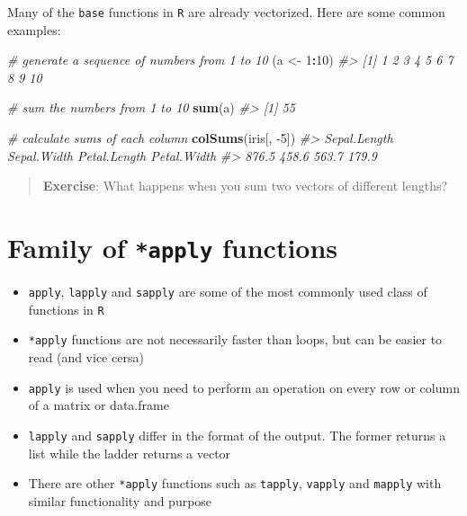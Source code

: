 \documentclass[]{book}
\makeatletter
\newenvironment{Shaded}{\begin{snugshade}}{\end{snugshade}}
\newcommand{\KeywordTok}[1]{\textcolor[rgb]{0.13,0.29,0.53}{\textbf{#1}}}
\newcommand{\DecValTok}[1]{\textcolor[rgb]{0.00,0.00,0.81}{#1}}
\newcommand{\StringTok}[1]{\textcolor[rgb]{0.31,0.60,0.02}{#1}}
\newcommand{\CommentTok}[1]{\textcolor[rgb]{0.56,0.35,0.01}{\textit{#1}}}
\newcommand{\OperatorTok}[1]{\textcolor[rgb]{0.81,0.36,0.00}{\textbf{#1}}}
\newcommand{\NormalTok}[1]{#1}
\providecommand{\tightlist}{%
  \setlength{\itemsep}{0pt}\setlength{\parskip}{0pt}}
\providecommand{\tightlist}{%
  \setlength{\itemsep}{0pt}\setlength{\parskip}{0pt}}
\newenvironment{kframe}{%
\medskip{}
\setlength{\fboxsep}{.8em}
 \def\at@end@of@kframe{}%
 \ifinner\ifhmode%
  \def\at@end@of@kframe{\end{minipage}}%
  \begin{minipage}{\columnwidth}%
 \fi\fi%
 \def\FrameCommand##1{\hskip\@totalleftmargin \hskip-\fboxsep
 \colorbox{shadecolor}{##1}\hskip-\fboxsep
     \hskip-\linewidth \hskip-\@totalleftmargin \hskip\columnwidth}%
 \MakeFramed {\advance\hsize-\width
   \@totalleftmargin\z@ \linewidth\hsize
   \@setminipage}}%
 {\par\unskip\endMakeFramed%
 \at@end@of@kframe}
\renewenvironment{Shaded}{\begin{kframe}}{\end{kframe}}
\makeatother
\begin{document}
Many of the \texttt{base} functions in \texttt{R} are already
vectorized. Here are some common examples:

\begin{Shaded}
\begin{Highlighting}[]

\CommentTok{# generate a sequence of numbers from 1 to 10}
\NormalTok{(a <-}\StringTok{ }\DecValTok{1}\OperatorTok{:}\DecValTok{10}\NormalTok{)}
\CommentTok{#>  [1]  1  2  3  4  5  6  7  8  9 10}

\CommentTok{# sum the numbers from 1 to 10}
\KeywordTok{sum}\NormalTok{(a)}
\CommentTok{#> [1] 55}

\CommentTok{# calculate sums of each column}
\KeywordTok{colSums}\NormalTok{(iris[, }\DecValTok{-5}\NormalTok{])}
\CommentTok{#> Sepal.Length  Sepal.Width Petal.Length  Petal.Width }
\CommentTok{#>        876.5        458.6        563.7        179.9}
\end{Highlighting}
\end{Shaded}

\begin{quote}
\textbf{Exercise}: What happens when you sum two vectors of different
lengths?
\end{quote}

\section{\texorpdfstring{Family of \texttt{*apply}
functions}{Family of *apply functions}}\label{family-of-apply-functions}

\begin{itemize}
\tightlist
\item
  \texttt{apply}, \texttt{lapply} and \texttt{sapply} are some of the
  most commonly used class of functions in \texttt{R}
\item
  \texttt{*apply} functions are not necessarily faster than loops, but
  can be easier to read (and vice cersa)
\item
  \texttt{apply} is used when you need to perform an operation on every
  row or column of a matrix or data.frame
\item
  \texttt{lapply} and \texttt{sapply} differ in the format of the
  output. The former returns a list while the ladder returns a vector
\item
  There are other \texttt{*apply} functions such as \texttt{tapply},
  \texttt{vapply} and \texttt{mapply} with similar functionality and
  purpose
\end{itemize}
\end{document}
